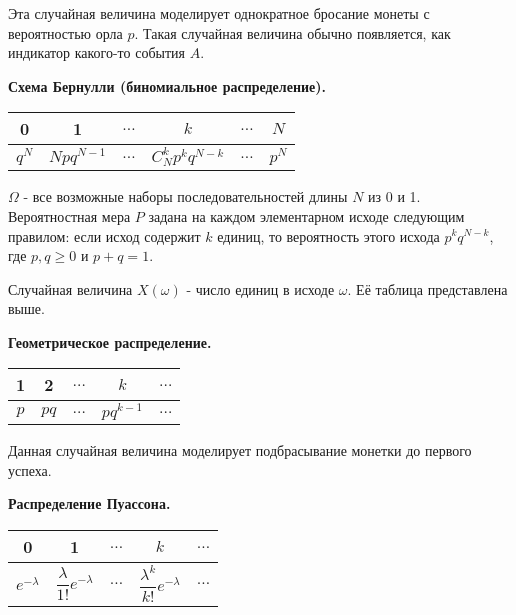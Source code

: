 \documentclass[a4paper]{article}
\begin{document}
\begin{colloq}
\begin{example}
   	Эта случайная величина моделирует однократное бросание монеты с вероятностью орла $p$. Такая случайная величина обычно появляется, как индикатор какого-то события $A$.
   	\end{example}
   
   \begin{example}
   	
   	\textbf{Схема Бернулли (биномиальное распределение).}
   	
   	\begin{tabular}{ | c | c | c | c | c | c |}
   		\hline
   		0 & 1 & $\dots$ & $k$ & $\dots$ & $N$ \\ \hline
   		$q^N$ & $Npq^{N-1}$ & $\dots$ & $C_N^k p^k q^{N-k}$ & $\dots$ & $p^N$ \\
   		\hline
   	\end{tabular}
   	
   	$\Omega$ - все возможные наборы последовательностей длины $N$ из 0 и 1. Вероятностная мера $P$ задана на каждом элементарном исходе следующим правилом: если исход содержит $k$ единиц, то вероятность этого исхода $p^k	q^{N-k}$, где $p, q \geqslant 0$ и $p + q = 1$.
   	
   	Случайная величина $X(\omega)$ - число единиц в исходе $\omega$. Её таблица представлена выше.
   \end{example}

	\begin{example}
		
		\textbf{Геометрическое распределение.}
		
		\begin{tabular}{ | c | c | c | c | c |}
			\hline
			1 & 2 & $\dots$ & $k$ & $\dots$ \\ \hline
			$p$ & $pq$ & $\dots$ & $p q^{k-1}$ & $\dots$ \\
			\hline
		\end{tabular}
		
		Данная случайная величина моделирует подбрасывание монетки до первого успеха.
	\end{example}

	\begin{example}
		
		\textbf{Распределение Пуассона.}
		
		\begin{tabular}{ | c | c | c | c | c |}
			\hline
			0 & 1 & $\dots$ & $k$ & $\dots$ \\ \hline
			$e^{-\lambda}$ & $\dfrac{\lambda}{1!} e^{-\lambda}$ & $\dots$ & $\dfrac{\lambda^k}{k!} e^{-\lambda}$ & $\dots$ \\
			\hline
		\end{tabular}
	

\end{example}
\end{colloq}
\end{document}
